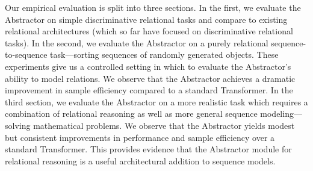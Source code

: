 Our empirical evaluation is split into three sections. In the first, we evaluate the Abstractor on simple discriminative relational tasks and compare to existing relational architectures (which so far have focused on discriminative relational tasks). In the second, we evaluate the Abstractor on a purely relational sequence-to-sequence task---sorting sequences of randomly generated objects. These experiments give us a controlled setting in which to evaluate the Abstractor's ability to model relations. We observe that the Abstractor achieves a dramatic improvement in sample efficiency compared to a standard Transformer. In the third section, we evaluate the Abstractor on a more realistic task which requires a combination of relational reasoning as well as more general sequence modeling---solving mathematical problems. We observe that the Abstractor yields modest but consistent improvements in performance and sample efficiency over a standard Transformer. This provides evidence that the Abstractor module for relational reasoning is a useful architectural addition to sequence models.

